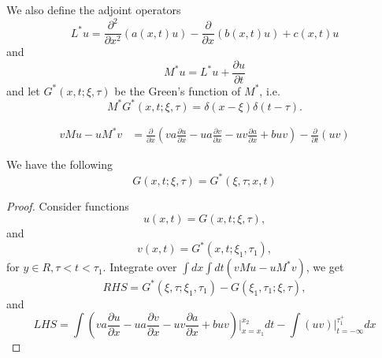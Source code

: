 We also define the adjoint operators
\begin{equation}
  L^* u = \frac{\partial^2}{\partial x^2} (a(x,t) u)
       - \frac{\partial}{\partial x} (b(x,t) u) + c(x,t) u
\end{equation}
and
\begin{equation}
  M^* u = L^* u + \frac{\partial u}{\partial t} 
\end{equation}
and let $G^*(x,t;\xi,\tau)$ be the Green's function of $M^*$, i.e.
\begin{equation}
  M^* G^*(x,t;\xi,\tau) = \delta(x-\xi) \delta(t-\tau).
\end{equation}

\begin{align*}
  v M u - u M^* v &=
     \frac{\partial}{\partial x} \left(
       v a \frac{\partial u}{\partial x} - u a \frac{\partial v}{\partial x}
       - u v \frac{\partial a}{\partial x} + b u v
     \right)
     - \frac{\partial}{\partial t} (u v)
\end{align*}

\begin{lemma}
We have the following 
\begin{equation}
  G(x,t;\xi,\tau) = G^*(\xi,\tau;x,t)
\end{equation}
\begin{proof}
Consider functions
\[
  u(x,t) = G(x,t;\xi,\tau),
\]
and
\[
  v(x,t) = G^*(x,t;\xi_1,\tau_1),
\]
for $y\in R, \tau<t<\tau_1$.
Integrate over $\int dx \int dt (v M u- u M^* v)$, we get
\[
  RHS = G^*(\xi,\tau;\xi_1,\tau_1) - G(\xi_1,\tau_1;\xi,\tau),
\]
and
\[
  LHS = \int \left(    
          v a \frac{\partial u}{\partial x} - u a \frac{\partial v}{\partial x}
          - u v \frac{\partial a}{\partial x} + b u v
        \right) \bigg\rvert_{x=x_1}^{x_2} dt
        - \int \left( u v  \right) \bigg\rvert_{t=-\infty}^{\tau_1^+} dx 
\]

\end{proof}
\end{lemma}
